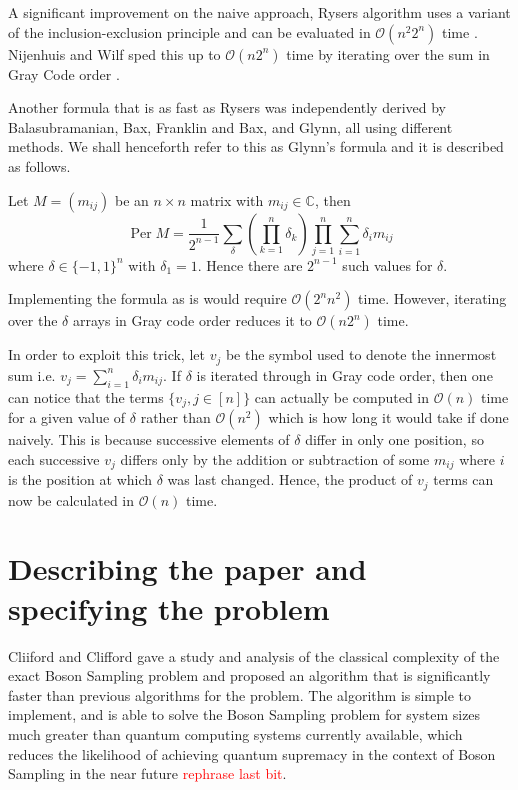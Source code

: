 \documentclass[11pt]{article}
\theoremstyle{theorem}
\theoremstyle{theorem}
\theoremstyle{remark}
\theoremstyle{note}
\theoremstyle{plain}
\theoremstyle{definition}
\DeclareMathOperator*{\Per}{\mathrm{Per}}
\begin{document}
A significant improvement on the naive approach, Rysers algorithm uses a variant of the inclusion-exclusion principle and can be evaluated in $\mathcal{O}(n^2 2^n)$ time  \cite{ryser_1963}. Nijenhuis and Wilf sped this up to $\mathcal{O}(n2^n)$ time by iterating over the sum in Gray Code order \cite{Nijenhuis1978}.

Another formula that is as fast as Rysers was independently derived by Balasubramanian\cite{balasubramanian1980}, Bax\cite{bax1998}, Franklin and Bax\cite{bax1996}, and Glynn\cite{glynn2010}, all using different methods. We shall henceforth refer to this as Glynn's formula and it is described as follows.

Let $M = (m_{ij})$ be an $n \times n$ matrix with $m_{ij} \in \mathbb{C}$, then
\begin{equation}
\Per M = \frac{1}{2^{n-1}} \sum_\delta \left( \prod_{k=1}^n \delta_k \right) \prod_{j=1}^n\sum_{i=1}^n \delta_i m_{ij}
\end{equation}
where $\delta \in \{-1, 1\}^n$ with $\delta_1 = 1$. Hence there are $2^{n-1}$ such values for $\delta$.

Implementing the formula as is would require $\mathcal{O}(2^n n^2)$ time. However, iterating over the $\delta$ arrays in Gray code order reduces it to $\mathcal{O}(n 2^n)$ time.

In order to exploit this trick, let $v_j$ be the symbol used to denote the innermost sum i.e. $v_j = \sum_{i=1}^n \delta_i m_{ij}$. If $\delta$ is iterated through in Gray code order, then one can notice that the terms $\{ v_j, j \in [n]\}$ can actually be computed in $\mathcal{O}(n)$ time for a given value of $\delta$ rather than $\mathcal{O}(n^2)$ which is how long it would take if done naively. This is because successive elements of $\delta$ differ in only one position, so each successive $v_j$ differs only by the addition or subtraction of some $m_{ij}$ where $i$ is the position at which $\delta$ was last changed. Hence, the product of $v_j$ terms can now be calculated in $\mathcal{O}(n)$ time.
\section{Describing the paper and specifying the problem} %
Cliiford and Clifford \cite{clifford17} gave a study and analysis of the classical complexity of the exact Boson Sampling problem and proposed an algorithm that is significantly faster than previous algorithms for the problem. The algorithm is simple to implement, and is able to solve the Boson Sampling problem for system sizes much greater than quantum computing systems currently available, which reduces the likelihood of achieving quantum supremacy in the context of Boson Sampling in the near future \textcolor{red}{rephrase last bit}.
\end{document}
